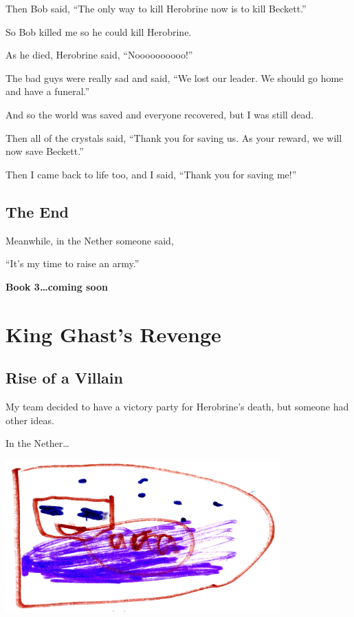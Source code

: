 \documentclass[12pt,twoside]{krantz}
\begin{document}
Then Bob said, ``The only way to kill Herobrine now is to kill
Beckett.''

So Bob killed me so he could kill Herobrine.

As he died, Herobrine said, ``Noooooooooo!''

The bad guys were really sad and said, ``We lost our leader. We should
go home and have a funeral.''

And so the world was saved and everyone recovered, but I was still dead.

Then all of the crystals said, ``Thank you for saving us. As your
reward, we will now save Beckett.''

Then I came back to life too, and I said, ``Thank you for saving me!''

\hypertarget{the-end}{%
\section*{The End}\label{the-end}}


Meanwhile, in the Nether someone said,

``It's my time to raise an army.''

\textbf{Book 3\ldots{}coming soon}

\hypertarget{king-ghasts-revenge}{%
\chapter{King Ghast's Revenge}\label{king-ghasts-revenge}}

\hypertarget{rise-of-a-villain}{%
\section{Rise of a Villain}\label{rise-of-a-villain}}

My team decided to have a victory party for Herobrine's death, but
someone had other ideas.

In the Nether\ldots{}

\includegraphics[width=4.16667in,height=\textheight]{img/king-ghast/03-aaa.jpg}
\end{document}
